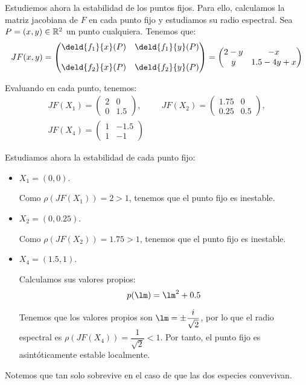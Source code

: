 \begin{ejercicio}
    Estudiemos ahora la estabilidad de los puntos fijos. Para ello,
    calculamos la matriz jacobiana de $F$ en cada punto fijo y estudiamos
    su radio espectral. Sea $P=(x,y)\in \mathbb{R}^2$ un punto cualquiera. Tenemos que:
    \begin{equation*}
        JF(x,y) = \begin{pmatrix}
            \deld{f_1}{x}(P) & \deld{f_1}{y}(P)\\ \\
            \deld{f_2}{x}(P) & \deld{f_2}{y}(P)
        \end{pmatrix}
        = \begin{pmatrix}
            2 - y & -x\\
            y & 1.5 - 4y + x
        \end{pmatrix}
    \end{equation*}

    Evaluando en cada punto, tenemos:
    \begin{gather*}
        JF(X_1) = \begin{pmatrix}
            2 & 0\\
            0 & 1.5
        \end{pmatrix},\hspace{1cm}
        JF(X_2) = \begin{pmatrix}
            1.75 & 0\\
            0.25 & 0.5
        \end{pmatrix},\\
        JF(X_4) = \begin{pmatrix}
            1 & -1.5\\
            1 & -1
        \end{pmatrix}
    \end{gather*}

    Estudiamos ahora la estabilidad de cada punto fijo:
    \begin{itemize}
        \item $X_1=(0,0)$.
        
        Como $\rho(JF(X_1)) = 2>1$, tenemos que el punto fijo es inestable.

        \item $X_2=(0,0.25)$.
        
        Como $\rho(JF(X_2)) = 1.75>1$, tenemos que el punto fijo es inestable.

        \item $X_4=(1.5,1)$.
        
        Calculamos sus valores propios:
        \begin{equation*}
            p(\lm) = \lm^2 + 0.5
        \end{equation*}

        Tenemos que los valores propios son $\lm=\pm \dfrac{i}{\sqrt{2}}$, por lo que el radio espectral es $\rho(JF(X_4)) = \dfrac{1}{\sqrt{2}} < 1$. Por tanto, el punto fijo es asintóticamente estable localmente.
    \end{itemize}

    Notemos que tan solo sobrevive en el caso de que las dos especies convevivan.
\end{ejercicio}
